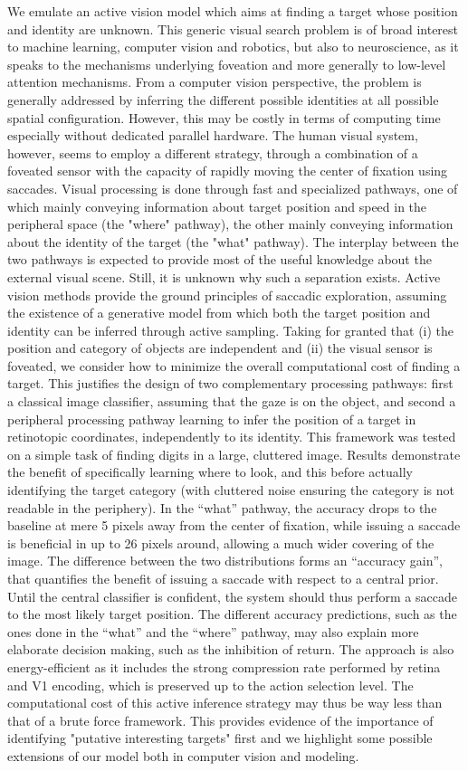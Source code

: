 We emulate an active vision model which aims at finding a target whose position and identity are unknown. This generic visual search problem is of broad interest to machine learning, computer vision and robotics, but also to neuroscience, as it speaks to the mechanisms underlying foveation and more generally to low-level attention mechanisms. 
From a computer vision perspective, the problem is generally addressed by inferring the different possible identities at all possible spatial configuration. However, this may be costly in terms of computing time especially without dedicated parallel hardware. The human visual system, however, seems to employ a different strategy, through a combination of a foveated sensor with the capacity of rapidly moving the center of fixation using saccades. Visual processing is done through fast and specialized pathways, one of which mainly conveying information about target position and speed in the peripheral space (the "where" pathway), the other mainly conveying information about the identity of the target (the "what" pathway). The interplay between the two pathways is expected to provide most of the useful knowledge about the external visual scene. Still, it is unknown why such a separation exists. Active vision methods provide the ground principles of saccadic exploration, assuming the existence of a generative model from which both the target position and identity can be inferred through active sampling. Taking for granted that (i) the position and category of objects are independent and (ii) the visual sensor is foveated, we consider how to minimize the overall computational cost of finding a target. This justifies the design of two complementary processing pathways: first a classical image classifier, assuming that the gaze is on the object, and second a peripheral processing pathway learning to infer the position of a target in retinotopic coordinates, independently to its identity. This framework was tested on a simple task of finding digits in a large, cluttered image. Results demonstrate the benefit of specifically learning where to look, and this before actually identifying the target category (with cluttered noise ensuring the category is not readable in the periphery). In the “what” pathway, the accuracy drops to the baseline at mere 5 pixels away from the center of fixation, while issuing a saccade is beneficial in up to 26 pixels around, allowing a much wider covering of the image. The difference between the two distributions forms an “accuracy gain”, that quantifies the benefit of issuing a saccade with respect to a central prior. Until the central classifier is confident, the system should thus perform a saccade to the most likely target position. The different accuracy predictions, such as the ones done in the “what” and the “where” pathway, may also explain more elaborate decision making, such as the inhibition of return. The approach is also energy-efficient as it includes the strong compression rate performed by retina and V1 encoding, which is preserved up to the action selection level. The computational cost of this active inference strategy may thus be way less than that of a brute force framework. This provides evidence of the importance of identifying "putative interesting targets" first and we highlight some possible extensions of our model both in computer vision and modeling.
